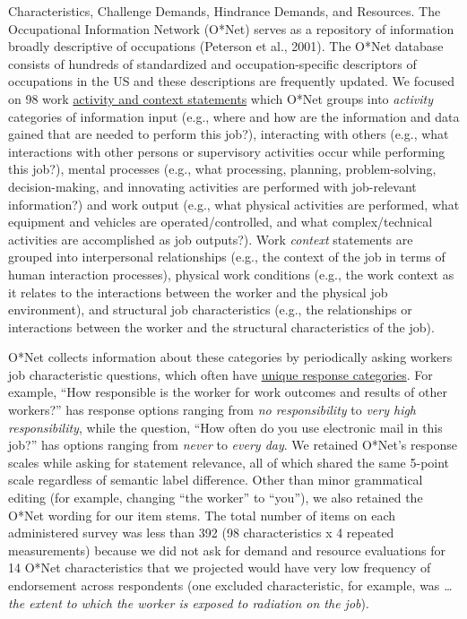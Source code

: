 \documentclass[
  man]{apa7}
\begin{document}
Characteristics, Challenge Demands, Hindrance Demands, and Resources. The Occupational Information Network (O*Net) serves as a repository of information broadly descriptive of occupations (Peterson et al., 2001). The O*Net database consists of hundreds of standardized and occupation-specific descriptors of occupations in the US and these descriptions are frequently updated. We focused on 98 work \href{https://www.ONETonline.org/find/descriptor/result/4.A.1.b.3}{activity and context statements} which O*Net groups into \emph{activity} categories of information input (e.g., where and how are the information and data gained that are needed to perform this job?), interacting with others (e.g., what interactions with other persons or supervisory activities occur while performing this job?), mental processes (e.g., what processing, planning, problem-solving, decision-making, and innovating activities are performed with job-relevant information?) and work output (e.g., what physical activities are performed, what equipment and vehicles are operated/controlled, and what complex/technical activities are accomplished as job outputs?). Work \emph{context} statements are grouped into interpersonal relationships (e.g., the context of the job in terms of human interaction processes), physical work conditions (e.g., the work context as it relates to the interactions between the worker and the physical job environment), and structural job characteristics (e.g., the relationships or interactions between the worker and the structural characteristics of the job).

O*Net collects information about these categories by periodically asking workers job characteristic questions, which often have \href{https://www.ONETonline.org/find/descriptor/result/4.C.1.c.2}{unique response categories}. For example, ``How responsible is the worker for work outcomes and results of other workers?'' has response options ranging from \emph{no responsibility} to \emph{very high responsibility}, while the question, ``How often do you use electronic mail in this job?'' has options ranging from \emph{never} to \emph{every day}. We retained O*Net's response scales while asking for statement relevance, all of which shared the same 5-point scale regardless of semantic label difference. Other than minor grammatical editing (for example, changing ``the worker'' to ``you''), we also retained the O*Net wording for our item stems. The total number of items on each administered survey was less than 392 (98 characteristics x 4 repeated measurements) because we did not ask for demand and resource evaluations for 14 O*Net characteristics that we projected would have very low frequency of endorsement across respondents (one excluded characteristic, for example, was \emph{\ldots the extent to which the worker is exposed to radiation on the job}).
\end{document}
